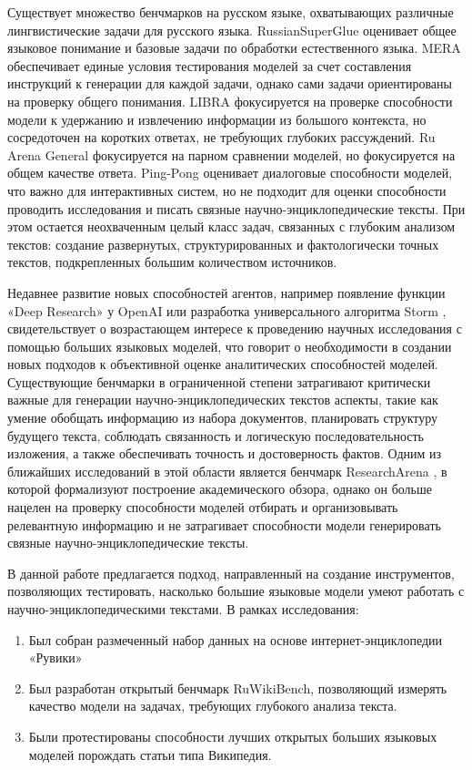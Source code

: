 \documentclass{article}
\begin{document}
Существует множество бенчмарков на русском языке, охватывающих различные лингвистические задачи для русского языка.
RussianSuperGlue \cite{rsglue} оценивает общее языковое понимание и базовые задачи по обработки естественного языка. 
MERA \cite{mera} обеспечивает единые условия тестирования моделей за счет составления инструкций к генерации для каждой задачи, однако сами задачи ориентированы на проверку общего понимания. 
LIBRA \cite{libra} фокусируется на проверке способности модели к удержанию и извлечению информации из большого контекста, но сосредоточен на коротких ответах, не требующих глубоких рассуждений. 
Ru Arena General \cite{arena} фокусируется на парном сравнении моделей, но фокусируется на общем качестве ответа.
Ping-Pong \cite{pp} оценивает диалоговые способности моделей, что важно для интерактивных систем, но не подходит для оценки способности проводить исследования и писать связные научно-энциклопедические тексты.
При этом остается неохваченным целый класс задач, связанных с глубоким анализом текстов: создание развернутых, структурированных и фактологически точных текстов, подкрепленных большим количеством источников. 

Недавнее развитие новых способностей агентов, например появление функции «Deep Research» у OpenAI \cite{deepr} или разработка  универсального алгоритма Storm \cite{storm}, 
свидетельствует о возрастающем интересе к проведению научных исследования с помощью больших языковых моделей, 
что говорит о необходимости в создании новых подходов к объективной оценке аналитических способностей моделей. 
Существующие бенчмарки в ограниченной степени затрагивают критически важные для генерации научно-энциклопедических текстов аспекты, 
такие как умение обобщать информацию из набора документов, планировать структуру будущего текста, соблюдать связанность и логическую последовательность изложения, а также обеспечивать точность и достоверность фактов. 
Одним из ближайших исследований в этой области является бенчмарк ResearchArena \cite{resar}, в которой формализуют построение академического обзора, 
однако он больше нацелен на проверку способности моделей отбирать и организовывать релевантную информацию
и не затрагивает способности модели генерировать связные научно-энциклопедические тексты.

В данной работе предлагается подход, направленный на создание 
инструментов, позволяющих тестировать, насколько большие языковые модели умеют работать с научно-энциклопедическими текстами.
В рамках исследования:
\begin{enumerate}

    \item Был собран размеченный набор данных на основе интернет-энциклопедии «Рувики»
    
    \item Был разработан открытый бенчмарк RuWikiBench, позволяющий измерять качество модели на задачах, требующих глубокого анализа текста.
    
    \item Были протестированы способности лучших открытых больших языковых моделей порождать статьи типа Википедия.

\end{enumerate}
\end{document}
